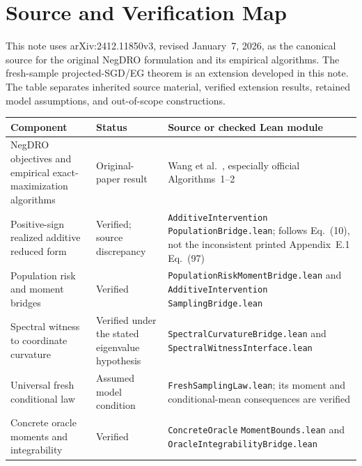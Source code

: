 \section{Source and Verification Map}
\label{app:version-map}

This note uses arXiv:2412.11850v3, revised January~7, 2026, as the canonical
source for the original NegDRO formulation and its empirical algorithms.  The
fresh-sample projected-SGD/EG theorem is an extension developed in this note.
The table separates inherited source material, verified extension results,
retained model assumptions, and out-of-scope constructions.

\begin{center}
\small
\begin{tabular}{>{\raggedright\arraybackslash}p{}
                >{\raggedright\arraybackslash}p{}
                >{\raggedright\arraybackslash}p{}}
\toprule
Component & Status & Source or checked Lean module \\
\midrule
NegDRO objectives and empirical exact-maximization algorithms
& Original-paper result
& Wang et al.~\cite{wang2026negdro}, especially official Algorithms~1--2 \\

Positive-sign realized additive reduced form
& Verified; source discrepancy
& \texttt{AdditiveIntervention}\newline
  \texttt{PopulationBridge.lean}; follows Eq.~(10), not
  the inconsistent printed Appendix~E.1 Eq.~(97) \\

Population risk and moment bridges
& Verified
& \texttt{PopulationRiskMomentBridge.lean} and
  \texttt{AdditiveIntervention}\newline
  \texttt{SamplingBridge.lean} \\

Spectral witness to coordinate curvature
& Verified under the stated eigenvalue hypothesis
& \texttt{SpectralCurvatureBridge.lean} and
  \texttt{SpectralWitnessInterface.lean} \\

Universal fresh conditional law
& Assumed model condition
& \texttt{FreshSamplingLaw.lean}; its moment and conditional-mean
  consequences are verified \\

Concrete oracle moments and integrability
& Verified
& \texttt{ConcreteOracle}\newline
  \texttt{MomentBounds.lean} and
  \texttt{OracleIntegrabilityBridge.lean} \\


\end{tabular}
\end{center}
